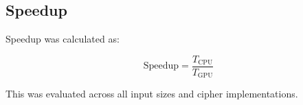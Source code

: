 \subsection{Speedup}

Speedup was calculated as:

\begin{equation}
\text{Speedup} = \frac{T_{\text{CPU}}}{T_{\text{GPU}}}
\end{equation}

This was evaluated across all input sizes and cipher implementations.